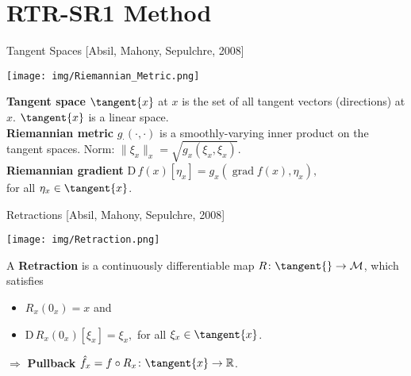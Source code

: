 \documentclass{beamer}
\begin{document}
\section{RTR-SR1 Method}

\begin{frame}{Tangent Spaces}
    \vspace{-0.5\baselineskip}\hfill{\tiny{[Absil, Mahony, Sepulchre, 2008]}}
    \begin{center}
        \texttt{[image: img/Riemannian\_Metric.png]}
    \end{center}
    \textbf{Tangent space} $\tangent{x}$ at $x$ is the set of all tangent vectors (directions) at $x$. $\tangent{x}$ is a linear space. \\[0.2\baselineskip]
    \textbf{Riemannian metric} $g_{\cdot} (\cdot, \cdot)$ is a smoothly-varying inner product on the tangent spaces. Norm: $\lVert \xi_x \rVert_x = \sqrt{g_x(\xi_x, \xi_x)}$. \\[0.2\baselineskip]
    \textbf{Riemannian gradient} $\mathrm{D} \, f(x) [\eta_x] = g_x (\operatorname{grad} f(x), \eta_x),$ \\
    for all $\eta_x \in \tangent{x}$.
\end{frame}

\begin{frame}{Retractions}
    \vspace{-0.5\baselineskip}\hfill{\tiny{[Absil, Mahony, Sepulchre, 2008]}}
    \begin{center}
        \texttt{[image: img/Retraction.png]}
    \end{center}
    A \textbf{Retraction} is a continuously differentiable map $R \colon \tangent{} \to \mathcal{M}$, which satisfies \\[-0.1\baselineskip]
    \begin{itemize}
        \item $R_x (0_x) = x$ and
        \item $\mathrm{D} \, R_x (0_x)[\xi_x] = \xi_x,$ for all $\xi_x \in \tangent{x}$.
    \end{itemize}
    $\Rightarrow$ \textbf{Pullback} $\hat{f}_x = f \circ R_x \colon \tangent{x} \to \mathbb{R}$.
\end{frame}
\end{document}
